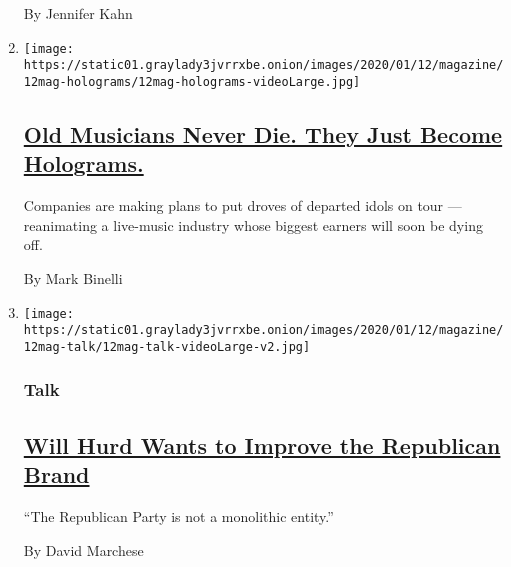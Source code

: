 \begin{enumerate}
  By Jennifer Kahn
\item
  \texttt{[image: https://static01.graylady3jvrrxbe.onion/images/2020/01/12/magazine/12mag-holograms/12mag-holograms-videoLarge.jpg]}

  \hypertarget{old-musicians-never-die-they-just-become-holograms}{%
  \subsection{\texorpdfstring{\href{/2020/01/07/magazine/hologram-musicians.html}{Old
  Musicians Never Die. They Just Become
  Holograms.}}{Old Musicians Never Die. They Just Become Holograms.}}\label{old-musicians-never-die-they-just-become-holograms}}

  Companies are making plans to put droves of departed idols on tour ---
  reanimating a live-music industry whose biggest earners will soon be
  dying off.

  By Mark Binelli
\item
  \texttt{[image: https://static01.graylady3jvrrxbe.onion/images/2020/01/12/magazine/12mag-talk/12mag-talk-videoLarge-v2.jpg]}

  \hypertarget{talk}{%
  \subsubsection{Talk}\label{talk}}

  \hypertarget{will-hurd-wants-to-improve-the-republican-brand}{%
  \subsection{\texorpdfstring{\href{/interactive/2020/01/06/magazine/will-hurd-interview.html}{Will
  Hurd Wants to Improve the Republican
  Brand}}{Will Hurd Wants to Improve the Republican Brand}}\label{will-hurd-wants-to-improve-the-republican-brand}}

  ``The Republican Party is not a monolithic entity.''

  By David Marchese
\end{enumerate}

